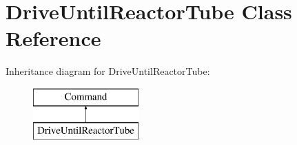 \hypertarget{classDriveUntilReactorTube}{\section{Drive\-Until\-Reactor\-Tube Class Reference}
\label{classDriveUntilReactorTube}
}
Inheritance diagram for Drive\-Until\-Reactor\-Tube\-:\begin{figure}[H]
\begin{center}
\leavevmode
\includegraphics[height=2.000000cm]{classDriveUntilReactorTube}
\end{center}
\end{figure}
